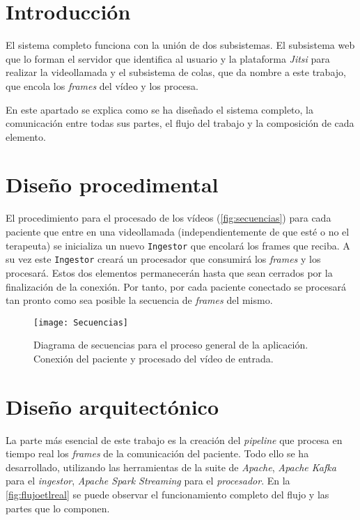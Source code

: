 
\section{Introducción}

El sistema completo funciona con la unión de dos subsistemas. El subsistema web que lo forman el servidor que identifica al usuario y la plataforma \textit{Jitsi} para realizar la videollamada y el subsistema de colas, que da nombre a este trabajo, que encola los \textit{frames} del vídeo y los procesa. 

En este apartado se explica como se ha diseñado el sistema completo, la comunicación entre todas sus partes, el flujo del trabajo y la composición de cada elemento.

\section{Diseño procedimental}

El procedimiento para el procesado de los vídeos (\autoref{fig:secuencias}) para cada paciente que entre en una videollamada (independientemente de que esté o no el terapeuta) se inicializa un nuevo \texttt{Ingestor} que encolará los frames que reciba. A su vez este \texttt{Ingestor} creará un procesador que consumirá los \textit{frames} y los procesará. Estos dos elementos permanecerán hasta que sean cerrados por la finalización de la conexión. Por tanto, por cada paciente conectado se procesará tan pronto como sea posible la secuencia de \textit{frames} del mismo.

\begin{figure}
	\centering
	\texttt{[image: Secuencias]}
	\caption[Diagrama de secuencia para el proceso general de la aplicación.]{Diagrama de secuencias para el proceso general de la aplicación. Conexión del paciente y procesado del vídeo de entrada.}
	\label{fig:secuencias}
\end{figure}



\section{Diseño arquitectónico}

La parte más esencial de este trabajo es la creación del \textit{pipeline} que procesa en tiempo real los \textit{frames} de la comunicación del paciente. Todo ello se ha desarrollado, utilizando las herramientas de la suite de \textit{Apache}, \textit{Apache Kafka} para el \textit{ingestor}, \textit{Apache Spark Streaming} para el \textit{procesador}. En la \autoref{fig:flujoetlreal} se puede observar el funcionamiento completo del flujo y las partes que lo componen.


